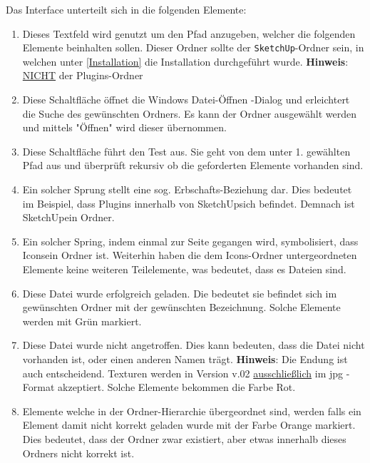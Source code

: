\documentclass{book}
\newcommand{\sketchup}{\texttt{SketchUp}\xspace}
\newcommand{\hinweis}[1]{\newline \textbf{Hinweis}: #1 \newline}
\newcommand{\green}[1]{\color{green!50!black}#1\color{black}\xspace}
\newcommand{\red}[1]{\color{red}#1\color{black}\xspace}
\newcommand{\orange}[1]{\color{orange}#1\color{black}\xspace}
\begin{document}
			Das Interface unterteilt sich in die folgenden Elemente:
			\begin{enumerate}
				\item Dieses Textfeld wird genutzt um den Pfad anzugeben, welcher die folgenden Elemente beinhalten sollen. Dieser Ordner sollte der \sketchup-Ordner sein, in welchen unter \ref{Installation} die Installation durchgeführt wurde. \hinweis{\underline{NICHT} der Plugins-Ordner}
				\item Diese Schaltfläche öffnet die Windows \glqq Datei-Öffnen \grqq-Dialog und erleichtert die Suche des gewünschten Ordners. Es kann der Ordner ausgewählt werden und mittels "Öffnen" wird dieser übernommen.
				\item Diese Schaltfläche führt den Test aus. Sie geht von dem unter 1. gewählten Pfad aus und überprüft rekursiv ob die geforderten Elemente vorhanden sind. 
				\item Ein solcher Sprung stellt eine sog. Erbschafts-Beziehung dar. Dies bedeutet im Beispiel, dass \glqq Plugins \grqq innerhalb von \glqq SketchUp\grqq sich befindet. Demnach ist \glqq SketchUp\grqq ein Ordner. 
				\item Ein solcher Spring, indem einmal zur Seite gegangen wird, symbolisiert, dass \glqq Icons\grqq ein Ordner ist. Weiterhin haben die dem \glqq Icons\grqq -Ordner untergeordneten Elemente keine weiteren Teilelemente, was bedeutet, dass es Dateien sind.
				\item Diese Datei wurde erfolgreich geladen. Die bedeutet sie befindet sich im gewünschten Ordner mit der gewünschten Bezeichnung. Solche Elemente werden mit \green{Grün} markiert.
				\item Diese Datei wurde nicht angetroffen. Dies kann bedeuten, dass die Datei nicht vorhanden ist, oder einen anderen Namen trägt. \hinweis{Die Endung ist auch entscheidend. Texturen werden in Version v.02 \underline{ausschließlich} im \glqq jpg \grqq-Format akzeptiert.}
				Solche Elemente bekommen die Farbe \red{Rot}.
				\item Elemente welche in der Ordner-Hierarchie übergeordnet sind, werden falls ein Element damit nicht korrekt geladen wurde mit der Farbe \orange{Orange} markiert. Dies bedeutet, dass der Ordner zwar existiert, aber etwas innerhalb dieses Ordners nicht korrekt ist. 
			\end{enumerate}
			
		
\end{document}
